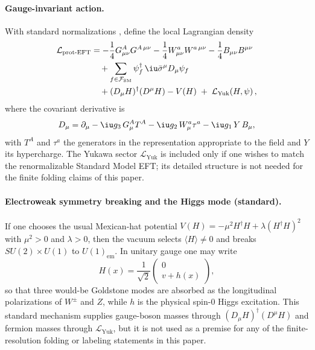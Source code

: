 \paragraph{Gauge-invariant action.}
With standard normalizations \cite{PeskinSchroeder1995,WeinbergQFT1995,PDGRPP2024}, define the local Lagrangian density
\begin{align}
\mathcal{L}_{\mathrm{prot\text{-}EFT}}
&=
-\frac{1}{4}G_{\mu\nu}^A G^{A\,\mu\nu}
-\frac{1}{4}W_{\mu\nu}^a W^{a\,\mu\nu}
-\frac{1}{4}B_{\mu\nu} B^{\mu\nu}
\nonumber\\
&\quad
+\sum_{f\in\mathcal{F}_{\mathrm{SM}}}\psi_f^\dagger\,\iu \bar{\sigma}^\mu D_\mu \psi_f
\nonumber\\
&\quad
+(D_\mu H)^\dagger (D^\mu H)-V(H)
\;+\;\mathcal{L}_{\mathrm{Yuk}}(H,\psi)\,,
\label{eq:protocol_eft_lagrangian}
\end{align}
where the covariant derivative is
\begin{equation}
D_\mu=\partial_\mu-\iu g_3\,G_\mu^A T^A-\iu g_2\,W_\mu^a \tau^a-\iu g_1\,Y\,B_\mu,
\label{eq:protocol_eft_covariant_derivative}
\end{equation}
with $T^A$ and $\tau^a$ the generators in the representation appropriate to the field and $Y$ its hypercharge.
The Yukawa sector $\mathcal{L}_{\mathrm{Yuk}}$ is included only if one wishes to match the renormalizable Standard Model EFT; its detailed structure is not needed for the finite folding claims of this paper.

\paragraph{Electroweak symmetry breaking and the Higgs mode (standard).}
If one chooses the usual Mexican-hat potential $V(H)=-\mu^2 H^\dagger H+\lambda (H^\dagger H)^2$ with $\mu^2>0$ and $\lambda>0$, then the vacuum selects $\langle H\rangle\neq 0$ and breaks $SU(2)\times U(1)$ to $U(1)_{\mathrm{em}}$.
In unitary gauge one may write
\[
H(x)=\frac{1}{\sqrt{2}}\begin{pmatrix}0\\ v+h(x)\end{pmatrix},
\]
so that three would-be Goldstone modes are absorbed as the longitudinal polarizations of $W^\pm$ and $Z$, while $h$ is the physical spin-$0$ Higgs excitation.
This standard mechanism supplies gauge-boson masses through $(D_\mu H)^\dagger(D^\mu H)$ and fermion masses through $\mathcal{L}_{\mathrm{Yuk}}$, but it is not used as a premise for any of the finite-resolution folding or labeling statements in this paper.

